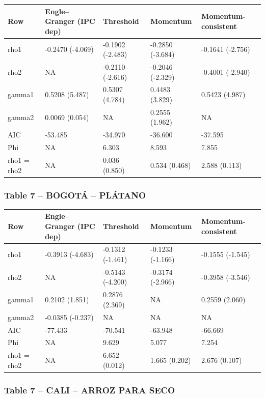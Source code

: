 \documentclass[
  12pt,
]{article}
\begin{document}
\begin{longtable}[t]{lllll}
\toprule
Row & Engle–Granger (IPC dep) & Threshold & Momentum & Momentum-consistent\\
\midrule
rho1 & -0.2470 (-4.069) & -0.1902 (-2.483) & -0.2850 (-3.684) & -0.1641 (-2.756)\\
rho2 & NA & -0.2110 (-2.616) & -0.2046 (-2.329) & -0.4001 (-2.940)\\
gamma1 & 0.5208 (5.487) & 0.5307 (4.784) & 0.4483 (3.829) & 0.5423 (4.987)\\
gamma2 & 0.0069 (0.054) & NA & 0.2555 (1.962) & NA\\
AIC & -53.485 & -34.970 & -36.600 & -37.595\\
\addlinespace
Phi & NA & 6.303 & 8.593 & 7.855\\
rho1 = rho2 & NA & 0.036 (0.850) & 0.534 (0.468) & 2.588 (0.113)\\
\bottomrule
\end{longtable}

\subsubsection{Table 7 -- BOGOTÁ --
PLÁTANO}\label{table-7-bogotuxe1-pluxe1tano}

\begin{longtable}[t]{lllll}
\toprule
Row & Engle–Granger (IPC dep) & Threshold & Momentum & Momentum-consistent\\
\midrule
rho1 & -0.3913 (-4.683) & -0.1312 (-1.461) & -0.1233 (-1.166) & -0.1555 (-1.545)\\
rho2 & NA & -0.5143 (-4.200) & -0.3174 (-2.966) & -0.3958 (-3.546)\\
gamma1 & 0.2102 (1.851) & 0.2876 (2.369) & NA & 0.2559 (2.060)\\
gamma2 & -0.0385 (-0.237) & NA & NA & NA\\
AIC & -77.433 & -70.541 & -63.948 & -66.669\\
\addlinespace
Phi & NA & 9.629 & 5.077 & 7.254\\
rho1 = rho2 & NA & 6.652 (0.012) & 1.665 (0.202) & 2.676 (0.107)\\
\bottomrule
\end{longtable}

\subsubsection{Table 7 -- CALI -- ARROZ PARA
SECO}\label{table-7-cali-arroz-para-seco}
\end{document}
